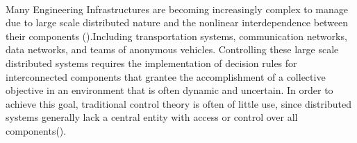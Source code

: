 \paragraph{}Many Engineering Infrastructures are becoming increasingly complex to manage due to large scale distributed nature and the nonlinear interdependence between their components (\cite{Quijano et al, 2017}).Including transportation systems, communication networks, data networks, and teams of anonymous vehicles. Controlling these large scale distributed systems requires the implementation of decision rules for interconnected components that grantee the accomplishment of a collective objective in an environment that is often dynamic and uncertain. In order to achieve this goal, traditional control theory is often of little use, since distributed systems generally lack a central  entity with access or control over all components(\cite{Marden and Shamma, 2015}).